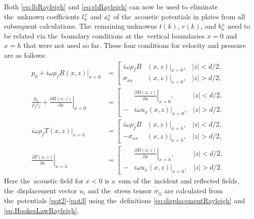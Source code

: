 Both \cref{eq:lbRayleigh} and \cref{eq:sbRayleigh} can now be used to eliminate the~unknown coefficients $l_n^{\pm}$ and $s_n^{\pm}$ of the~acoustic potentials in plates from all subsequent calculations.
The~remaining unknowns $t(k)$, $r(k)$, and $b_n^{\pm}$ need to be related via the~boundary conditions at the~vertical boundaries $x=0$ and $x=h$ that were not used so far.
These four conditions for velocity and pressure are as follows:
\begin{align}
p_0+i \omega \rho_f \left.R(x,z)\right|_{x=0} &= \left[
\begin{aligned}
i \omega \rho_f B&\left.(x, z)\right|_{x=0}, &|z| < d/2, \\
\sigma_{xx}&\left.(x,z)\right|_{x=0}, &|z| > d/2,
\end{aligned}
\right. \label{eq:bc12Rayleigh} \\
\frac{p_0}{\rho_f c_f}+\left.\frac{\partial R(x,z)}{\partial x}\right|_{x=0} &= \left[
\begin{aligned}
&\left.\frac{\partial B(x,z)}{\partial x}\right|_{x=0}, &|z| < d/2, \\
-&i \omega \left. u_x(x,z)\right|_{x=0}, &|z| > d/2,
\end{aligned}
\right. \label{eq:bc13Rayleigh}\\
i \omega \rho_f \left. T(x,z)\right|_{x=h} &= \left[
\begin{aligned}
i \omega \rho_f B&\left.(x, z)\right|_{x=h}, &|z| < d/2, \\
-\sigma_{xx}&\left.(x,z)\right|_{x=h}, &|z| > d/2,
\end{aligned}
\right. \label{eq:bc14Rayleigh} \\
\left.\frac{\partial T(x,z)}{\partial x}\right|_{x=h} &= \left[
\begin{aligned}
&\left.\frac{\partial B(x,z)}{\partial x}\right|_{x=h}, &|z| < d/2, \\
-&i \omega \left. u_x(x,z)\right|_{x=h}, &|z| > d/2.
\end{aligned}
\right. \label{eq:bc15Rayleigh}
\end{align}
Here the~acoustic field for $x<0$ is a~sum of the~incident and reflected fields, the~displacement vector $u_i$ and the~stress tensor $\sigma_{ij}$ are calculated from the~potentials \cref{pot2}-\cref{pot3} using the~definitions \cref{eq:displacementRayleigh} and \cref{eq:HookesLawRayleigh}.


